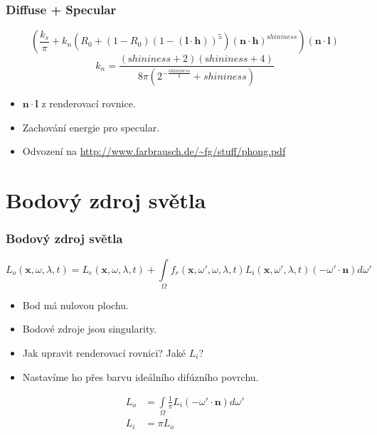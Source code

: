 \begin{frame}
    \frametitle{Diffuse + Specular}
    \begin{equation*}
        \left(\frac{k_s}{\pi} + k_n(R_0 + (1-R_0)(1-(\mathbf l \cdot \mathbf h))^5)(\mathbf n \cdot \mathbf h)^{\mathrm shininess}\right)(\mathbf n \cdot \mathbf l)
    \end{equation*}
    \begin{equation*}
        k_n = \frac{(\mathrm shininess + 2)(\mathrm shininess + 4)}{8\pi(2^{-\frac{shininess}{2}} + shininess)}
    \end{equation*}
    \begin{itemize}
        \item $\mathbf n \cdot \mathbf l$ z renderovací rovnice.
        \item Zachování energie pro specular.
        \item Odvození na \url{http://www.farbrausch.de/~fg/stuff/phong.pdf}
    \end{itemize}
\end{frame}

\section{Bodový zdroj světla}

\begin{frame}
    \frametitle{Bodový zdroj světla}
    \begin{equation*}
        L_o(\mathbf x, \omega, \lambda, t) = L_e(\mathbf x, \omega, \lambda, t) + \int\limits_\Omega f_r(\mathbf x, \omega', \omega, \lambda, t) L_i(\mathbf x, \omega', \lambda, t) (-\omega' \cdot \mathbf n) d \omega'
    \end{equation*}
    \begin{itemize}
        \item Bod má nulovou plochu.
        \item Bodové zdroje jsou singularity.
        \item Jak upravit renderovací rovnici? Jaké $L_i$?
        \pause
        \item Nastavíme ho přes barvu ideálního difúzního povrchu.
    \end{itemize}
    \begin{align*}
        L_o &= \int\limits_\Omega \frac{1}{\pi} L_i (-\omega' \cdot \mathbf n) d \omega' \\
        L_i &= \pi L_o
    \end{align*}
\end{frame}

